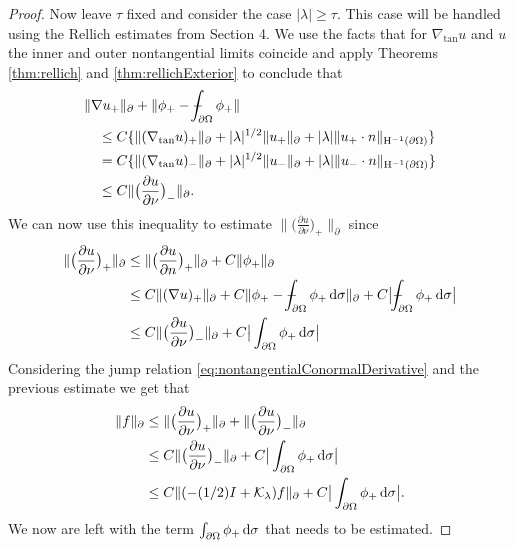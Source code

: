 \begin{proof}
  Now leave $\tau$ fixed and consider the case $|\lambda| \geq \tau$.
  This case will be handled using the Rellich estimates from Section 4.
  We use the facts that for $\nabla_{\mathrm{tan}} u$ and $u$ the inner and outer nontangential limits coincide and apply Theorems \ref{thm:rellich} and \ref{thm:rellichExterior} to conclude that
  \begin{align*}
    &\|\nabla u_+ \|_\partial + \| \phi_+ - \dashint_{\partial\Omega} \phi_+ \| \\
    &\quad\leq C \{ \|( \nabla_{\mathrm{tan}} u)_+ \|_\partial + |\lambda|^{1/2} \|u_+\|_\partial + |\lambda| \| u_+\cdot n\|_{\HH^{-1}(\partial\Omega)} \} \\
    &\quad = C \{ \|( \nabla_{\mathrm{tan}} u)_- \|_\partial + |\lambda|^{1/2} \|u_-\|_\partial + |\lambda| \| u_-\cdot n\|_{\HH^{-1}(\partial\Omega)} \} \\
    &\quad\leq C \| \big(\frac{\partial u}{\partial \nu} \big)_- \|_\partial.
  \end{align*}
  We can now use this inequality to estimate $\| \big( \frac{\partial u}{\partial \nu} \big)_+ \|_\partial$ since
  \begin{align*}
    \| \big( \frac{\partial u}{\partial \nu} \big)_+ \|_\partial
    &\leq \|\big(\frac{\partial u}{\partial n} \big)_+ \|_\partial + C \| \phi_+ \|_\partial \\
    &\leq C \| (\nabla u)_+ \|_\partial + C \|\phi_+ - \dashint_{\partial\Omega} \phi_+ \d\sigma \|_\partial + C \big| \dashint_{\partial\Omega} \phi_+ \d \sigma \big| \\
    &\leq C \| \big(\frac{\partial u}{\partial \nu} \big)_- \|_\partial + C \big| \int_{\partial\Omega} \phi_+ \d\sigma \big|
  \end{align*}
  Considering the jump relation \eqref{eq:nontangentialConormalDerivative} and the previous estimate we get that
  \begin{align}
    \|f \|_\partial 
    &\leq \|\big( \frac{\partial u}{\partial \nu} \big)_+ \|_\partial + \| \big( \frac{\partial u}{\partial \nu} \big)_- \|_\partial  \nonumber\\
    &\leq C \| \big( \frac{\partial u}{\partial \nu} \big)_- \|_\partial + C \big| \int_{\partial\Omega} \phi_+ \, {\operatorname{d}\!{\sigma}} \big| \nonumber\\
    \label{eq:estimatef}
    &\leq C \| (-(1/2)I + \mathcal{K}_\lambda) f \|_\partial + C \big| \int_{\partial\Omega} \phi_+ \, {\operatorname{d}\!{\sigma}} \big|.
  \end{align}
  We now are left with the term $\int_{\partial\Omega} \phi_+ \, {\operatorname{d}\!{\sigma}}$ that needs to be estimated.

\end{proof}
